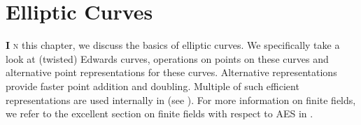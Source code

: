 \chapter{Elliptic Curves} \label{chp: Elliptic Curves}
\lettrine[lhang = 0.4, findent=-30pt, lines=4]{\textbf{
		\initfamily \fontsize{20mm}{20mm} \selectfont I
		\normalfont}}{n} 
this chapter, we discuss the basics of elliptic curves.
We specifically take a look at (twisted) Edwards curves, operations on points on these curves and alternative point representations for these curves.
Alternative representations provide faster point addition and doubling.
Multiple of such efficient representations are used internally in {\fourq} (see ).
For more information on finite fields, we refer to the excellent section on finite fields with respect to AES in \cite[§4.3]{paar2009understanding}.


